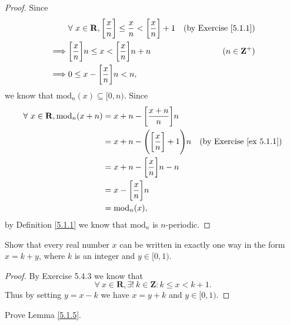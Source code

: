\begin{proof}
    Since
    \begin{align*}
                 & \forall\ x \in \mathbf{R}, \bigg[\frac{x}{n}\bigg] \leq \frac{x}{n} < \bigg[\frac{x}{n}\bigg] + 1 & \text{(by Exercise \ref{5.1.1})} \\
        \implies & \bigg[\frac{x}{n}\bigg] n \leq x < \bigg[\frac{x}{n}\bigg] n + n                                  & (n \in \mathbf{Z}^+)             \\
        \implies & 0 \leq x - \bigg[\frac{x}{n}\bigg] n < n,
    \end{align*}
    we know that \(\text{mod}_n(x) \subseteq [0, n)\).
    Since
    \begin{align*}
        \forall\ x \in \mathbf{R}, \text{mod}_n(x + n) & = x + n - \bigg[\frac{x + n}{n}\bigg] n                                                   \\
                                                       & = x + n - \Bigg(\bigg[\frac{x}{n}\bigg] + 1\Bigg) n & \text{(by Exercise \ref{ex 5.1.1})} \\
                                                       & = x + n - \bigg[\frac{x}{n}\bigg] n - n                                                   \\
                                                       & = x - \bigg[\frac{x}{n}\bigg] n                                                           \\
                                                       & = \text{mod}_n(x),
    \end{align*}
    by Definition \ref{5.1.1} we know that \(\text{mod}_n\) is \(n\)-periodic.
\end{proof}

\exercisesection

\begin{exercise}\label{ex 5.1.1}
    Show that every real number \(x\) can be written in exactly one way in the form \(x = k + y\), where \(k\) is an integer and \(y \in [0, 1)\).
\end{exercise}

\begin{proof}
    By Exercise 5.4.3 we know that
    \[
        \forall\ x \in \mathbf{R}, \exists!\ k \in \mathbf{Z} : k \leq x < k + 1.
    \]
    Thus by setting \(y = x - k\) we have \(x = y + k\) and \(y \in [0, 1)\).
\end{proof}

\begin{exercise}\label{ex 5.1.2}
    Prove Lemma \ref{5.1.5}.
\end{exercise}

